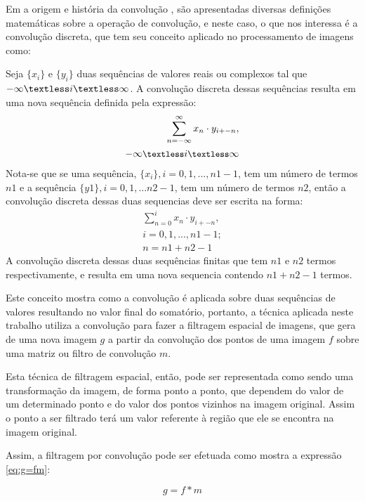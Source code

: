 Em a origem e história da convolução \cite{dominguez2010origin}, são apresentadas diversas definições matemáticas sobre a operação de convolução, e neste caso, o que nos interessa é a convolução discreta, que tem seu conceito aplicado no processamento de imagens como:

\begin{citacao}
Seja \(\{x_{i}\}\) e \(\{y_{i}\}\) duas sequências de valores reais ou complexos tal que \(-\infty \textless i \textless \infty\). A convolução discreta dessas sequências resulta em uma nova sequência definida pela expressão:
\[\begin{split}
\sum_{n=-\infty}^{\infty}x_{n} \cdot y_{i+-n}, \\ \small{-\infty \textless i \textless \infty}
\end{split}\] 
Nota-se que se uma sequência, \(\{x_{i}\}, i = 0, 1, ..., n1-1\), tem um número de termos \(n1\) e a sequência \(\{y1\}, i = 0, 1, ... n2-1\), tem um número de termos \(n2\), então a convolução discreta dessas duas sequencias deve ser escrita na forma:
\[\begin{split}
\sum_{n=0}^{i} x_{n} \cdot y_{i+-n}, \\i = 0, 1, ..., n1-1; \\n = n1 + n2 - 1
\end{split}\]
A convolução discreta dessas duas sequências finitas que tem \(n1\) e \(n2\) termos respectivamente, e resulta em uma nova sequencia contendo \(n1+n2-1\) termos. \cite{dominguez2010origin}
\end{citacao}

Este conceito mostra como a convolução é aplicada sobre duas sequências de valores resultando no valor final do somatório, portanto, a técnica aplicada neste trabalho utiliza a convolução para fazer a filtragem espacial de imagens, que gera de uma nova imagem \(g\) a partir da convolução dos pontos de uma imagem \(f\) sobre uma matriz ou filtro de convolução \(m\).

Esta técnica de filtragem espacial, então, pode ser representada como sendo uma transformação da imagem, de forma ponto a ponto, que dependem do valor de um determinado ponto e do valor dos pontos vizinhos na imagem original. Assim o ponto a ser filtrado terá um valor referente à região que ele se encontra na imagem original. 

Assim, a filtragem por convolução pode ser efetuada como mostra a expressão \ref{eq:g=fm}:

\begin{equation}
\label{eq:g=fm}
g = f * m
\end{equation}

